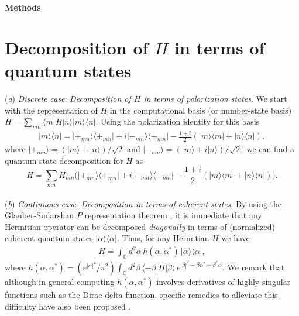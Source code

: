 \documentclass[aps,pra,twocolumn,floatfix,groupedaddress,superscriptaddress,nofootinbib,notitlepage]{revtex4-2}
\begin{document}
\onecolumngrid

\clearpage
\begin{center}{\textbf{Methods}}
\end{center}

\section{Decomposition of $H$ in terms of quantum states}

(\textit{a}) \textit{Discrete case}: \textit{Decomposition of $H$ in terms of polarization states}. We start with the representation of $H$ in the computational basis (or number-state basis) $H=\sum_{mn} \langle m | H | n \rangle |m \rangle \langle n|$. Using the polarization identity for this basis \cite{Book:Nielsen-Chuang} 
\begin{align}
|m \rangle \langle n| = |\mathsf{+}_{mn}\rangle\langle\mathsf{+}_{mn}| +i |\mathsf{-}_{mn}\rangle\langle\mathsf{-}_{mn}| - \textstyle{\frac{1+i}{2}} (|m\rangle\langle m| + |n\rangle\langle n|),
\label{polarization_bases}
\end{align}
where 
$|\mathsf{+}_{mn}\rangle=(|m \rangle + |n \rangle)/\sqrt{2}$ and $|-_{mn}\rangle=(|m \rangle+i|n \rangle)/\sqrt{2}$, we can find a quantum-state decomposition for $H$ as  
\begin{equation}
H=\textstyle{\sum}_{mn} H_{mn} \big(|\mathsf{+}_{mn}\rangle\langle\mathsf{+}_{mn}| +i |\mathsf{-}_{mn}\rangle\langle\mathsf{-}_{mn}|-\frac{1+i}{2}(|m\rangle\langle m|+|n\rangle\langle n|)\big).
\label{H-polarization}
\end{equation}
\\
(\textit{b}) \textit{Continuous case}: \textit{Decomposition in terms of coherent states}. By using the Glauber-Sudarshan $P$ representation  theorem \cite{Book:Scully-Zubairy, Fan, Goldberg}, it is immediate that any Hermitian operator can be decomposed \textit{diagonally} in terms of (normalized) coherent quantum states $|\alpha \rangle \langle \alpha|$. Thus, for any Hermitian $H$ we have
\begin{align}
H = \textstyle{\int_{\mathds{C}}} d^{2}\alpha \, h(\alpha, \alpha^{*}) \, |\alpha \rangle\langle \alpha|,
\label{H-coherent}
\end{align}
where $h(\alpha, \alpha^{*}) = (e^{|\alpha|^{2}}/\pi^{2}) \textstyle{\int_{\mathds{C}}} d^{2} \beta \, \langle - \beta| H |\beta \rangle \, e^{|\beta|^{2} - \beta \alpha^{*} + \beta^{*} \alpha}$. We remark that although in general computing $h(\alpha, \alpha^{*})$ involves derivatives of highly singular functions such as the Dirac delta function, specific remedies to alleviate this difficulty have also been proposed \cite{Klauder, Lobino, Keshari-Rezakhani}.
\end{document}
